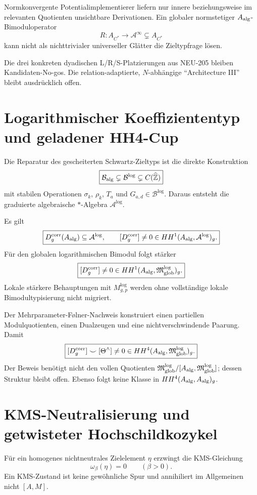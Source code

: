 \documentclass[11pt,a4paper]{article}
\begin{document}
Normkonvergente Potentialimplementierer liefern nur innere beziehungsweise im relevanten Quotienten unsichtbare Derivationen. Ein globaler normstetiger $A_{\rm alg}$-Bimoduloperator
\[
 R:A_{C^*}\to\mathcal A^\infty\subsetneq A_{C^*}
\]
kann nicht als nichttrivialer universeller Glätter die Zieltypfrage lösen.

Die drei konkreten dyadischen L/R/S-Platzierungen aus NEU-205 bleiben Kandidaten-No-gos. Die relation-adaptierte, $N$-abhängige ``Architecture III'' bleibt ausdrücklich offen.

\section{Logarithmischer Koeffiziententyp und geladener HH4-Cup}

Die Reparatur des gescheiterten Schwartz-Zieltyps ist die direkte Konstruktion
\[
 \boxed{\mathcal B_{\rm alg}\subsetneq\mathcal B^{\log}\subsetneq C(\widehat{\mathbb Z})}
\]
mit stabilen Operationen $\sigma_k$, $\rho_k$, $T_a$ und $G_{a,d}\in\mathcal B^{\log}$. Daraus entsteht die graduierte algebraische $*$-Algebra $\mathcal A^{\log}$.

Es gilt
\[
 \boxed{D_g^{\rm corr}(A_{\rm alg})\subseteq\mathcal A^{\log},\qquad
 [D_g^{\rm corr}]\neq0\in HH^1(A_{\rm alg},\mathcal A^{\log})_g.}
\]
Für den globalen logarithmischen Bimodul folgt stärker
\[
 \boxed{[D_g^{\rm corr}]\neq0\in HH^1(A_{\rm alg},\mathfrak M_{\rm glob}^{\log})_g.}
\]
Lokale stärkere Behauptungen mit $M_{g,p}^{\log}$ werden ohne vollständige lokale Bimodultypisierung nicht migriert.

Der Mehrparameter-Følner-Nachweis konstruiert einen partiellen Modulquotienten, einen Dualzeugen und eine nichtverschwindende Paarung. Damit
\[
 \boxed{[D_g^{\rm corr}]\smile[\Theta^\wedge]\neq0
 \in HH^4(A_{\rm alg},\mathfrak M_{\rm glob}^{\log})_g.}
\]
Der Beweis benötigt nicht den vollen Quotienten
$\mathfrak M_{\rm glob}^{\log}/[A_{\rm alg},\mathfrak M_{\rm glob}^{\log}]$; dessen Struktur bleibt offen. Ebenso folgt keine Klasse in $HH^4(A_{\rm alg},A_{\rm alg})_g$.

\section{KMS-Neutralisierung und getwisteter Hochschildkozykel}

Für ein homogenes nichtneutrales Zielelement $\eta$ erzwingt die KMS-Gleichung
\[
 \boxed{\omega_\beta(\eta)=0\qquad(\beta>0).}
\]
Ein KMS-Zustand ist keine gewöhnliche Spur und annihiliert im Allgemeinen nicht $[A,M]$.
\end{document}
